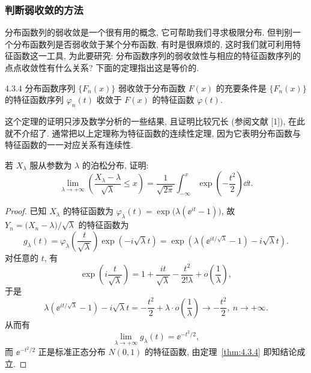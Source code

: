 \subsubsection{判断弱收敛的方法}

分布函数列的弱收敛是一个很有用的概念, 它可帮助我们寻求极限分布.
但判别一个分布函数列是否弱收敛于某个分布函数, 有时是很麻烦的, 这时我们就可利用特征函数这一工具, 为此要研究: 分布函数序列的弱收敛性与相应的特征函数序列的点点收敛性有什么关系?
下面的定理指出这是等价的.

\begin{theorem}{}{4.3.4}
    分布函数序列 $ \{ F_n (x) \} $ 弱收敛于分布函数 $ F (x) $ 的充要条件是 $ \{ F_n (x) \} $ 的特征函数序列 $ \varphi_n (t) $ 收敛于 $ F (x) $ 的特征函数 $ \varphi (t) $.
\end{theorem}

这个定理的证明只涉及数学分析的一些结果, 且证明比较冗长 (参阅文献
[1]), 在此就不介绍了.
通常把以上定理称为特征函数的连续性定理, 因为它表明分布函数与特征函数的一一对应关系有连续性.

\begin{example}\label{exam:4.3.3}
    若 $ X_\lambda $ 服从参数为 $ \lambda $ 的泊松分布, 证明:
    \begin{equation*}
        \lim_{\lambda \to +\infty} \left( \frac{X_\lambda - \lambda}{\sqrt{\lambda}} \leq x \right) = \frac{1}{\sqrt{2\pi}} \int_{-\infty}^x \exp \left( - \frac{t^2}{2} \right) \dd t.
    \end{equation*}
\end{example}

\begin{proof}
    已知 $ X_\lambda $ 的特征函数为 $ \varphi_\lambda (t) = \exp \bigl( \lambda ( \ee^{it} - 1 ) \bigr) $, 故 $ Y_n = \bigl( X_n - \lambda \bigr) / \sqrt{\lambda} $ 的特征函数为
    \begin{equation*}
        g_\lambda (t) = \varphi_\lambda \left( \frac{t}{\sqrt{\lambda}} \right) \exp \left( -i \sqrt{\lambda} t \right) = \exp \left( \lambda \left( \ee^{i t / \sqrt{\lambda}} - 1 \right) - i \sqrt{\lambda} t \right).
    \end{equation*}
    对任意的 $ t $, 有
    \begin{equation*}
        \exp \left( i \frac{t}{\sqrt{\lambda}} \right) = 1 + \frac{it}{\sqrt{\lambda}} - \frac{t^2}{2!\lambda} + o \left( \frac{1}{\lambda} \right),
    \end{equation*}
    于是
    \begin{equation*}
        \lambda \left( \ee^{it / \sqrt{\lambda}} - 1 \right) - i \sqrt{\lambda} t = - \frac{t^2}{2} + \lambda \cdot o \left( \frac{1}{\lambda} \right) \to - \frac{t^2}{2}, \ n \to +\infty.
    \end{equation*}
    从而有
    \begin{equation*}
        \lim_{\lambda \to +\infty} g_\lambda (t) = \ee^{-t^2 / 2},
    \end{equation*}
    而 $ \ee^{-t^2 / 2} $ 正是标准正态分布 $ N (0, 1) $ 的特征函数, 由定理~\ref{thm:4.3.4} 即知结论成立.
\end{proof}

